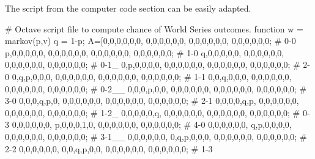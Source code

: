 \begin{ans}{6}
\begin{center}
     \end{center}
     \begin{exparts}
      \partsitem The script from the computer code section can be easily
        adapted.
\begin{computercode}
# Octave script file to compute chance of World Series outcomes.
function w = markov(p,v)
  q = 1-p;
  A=[0,0,0,0,0,0, 0,0,0,0,0,0, 0,0,0,0,0,0, 0,0,0,0,0,0;  # 0-0
     p,0,0,0,0,0, 0,0,0,0,0,0, 0,0,0,0,0,0, 0,0,0,0,0,0;  # 1-0
     q,0,0,0,0,0, 0,0,0,0,0,0, 0,0,0,0,0,0, 0,0,0,0,0,0;  # 0-1_
     0,p,0,0,0,0, 0,0,0,0,0,0, 0,0,0,0,0,0, 0,0,0,0,0,0;  # 2-0
     0,q,p,0,0,0, 0,0,0,0,0,0, 0,0,0,0,0,0, 0,0,0,0,0,0;  # 1-1
     0,0,q,0,0,0, 0,0,0,0,0,0, 0,0,0,0,0,0, 0,0,0,0,0,0;  # 0-2__
     0,0,0,p,0,0, 0,0,0,0,0,0, 0,0,0,0,0,0, 0,0,0,0,0,0;  # 3-0
     0,0,0,q,p,0, 0,0,0,0,0,0, 0,0,0,0,0,0, 0,0,0,0,0,0;  # 2-1
     0,0,0,0,q,p, 0,0,0,0,0,0, 0,0,0,0,0,0, 0,0,0,0,0,0;  # 1-2_
     0,0,0,0,0,q, 0,0,0,0,0,0, 0,0,0,0,0,0, 0,0,0,0,0,0;  # 0-3
     0,0,0,0,0,0, p,0,0,0,1,0, 0,0,0,0,0,0, 0,0,0,0,0,0;  # 4-0
     0,0,0,0,0,0, q,p,0,0,0,0, 0,0,0,0,0,0, 0,0,0,0,0,0;  # 3-1__
     0,0,0,0,0,0, 0,q,p,0,0,0, 0,0,0,0,0,0, 0,0,0,0,0,0;  # 2-2
     0,0,0,0,0,0, 0,0,q,p,0,0, 0,0,0,0,0,0, 0,0,0,0,0,0;  # 1-3

\end{computercode}
\end{exparts}
\end{ans}
